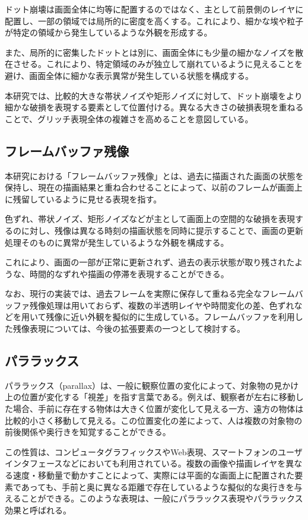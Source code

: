 ドット崩壊は画面全体に均等に配置するのではなく、主として前景側のレイヤに配置し、一部の領域では局所的に密度を高くする。これにより、細かな埃や粒子が特定の領域から発生しているような外観を形成する。

また、局所的に密集したドットとは別に、画面全体にも少量の細かなノイズを散在させる。これにより、特定領域のみが独立して崩れているように見えることを避け、画面全体に細かな表示異常が発生している状態を構成する。

本研究では、比較的大きな帯状ノイズや矩形ノイズに対して、ドット崩壊をより細かな破損を表現する要素として位置付ける。異なる大きさの破損表現を重ねることで、グリッチ表現全体の複雑さを高めることを意図している。


\subsection{フレームバッファ残像}

本研究における「フレームバッファ残像」とは、過去に描画された画面の状態を保持し、現在の描画結果と重ね合わせることによって、以前のフレームが画面上に残留しているように見せる表現を指す。

色ずれ、帯状ノイズ、矩形ノイズなどが主として画面上の空間的な破損を表現するのに対し、残像は異なる時刻の描画状態を同時に提示することで、画面の更新処理そのものに異常が発生しているような外観を構成する。

これにより、画面の一部が正常に更新されず、過去の表示状態が取り残されたような、時間的なずれや描画の停滞を表現することができる。

なお、現行の実装では、過去フレームを実際に保存して重ねる完全なフレームバッファ残像処理は用いておらず、複数の半透明レイヤや時間変化の差、色ずれなどを用いて残像に近い外観を擬似的に生成している。フレームバッファを利用した残像表現については、今後の拡張要素の一つとして検討する。


\subsection{パララックス}

パララックス（parallax）は、一般に観察位置の変化によって、対象物の見かけ上の位置が変化する「視差」を指す言葉である。例えば、観察者が左右に移動した場合、手前に存在する物体は大きく位置が変化して見える一方、遠方の物体は比較的小さく移動して見える。この位置変化の差によって、人は複数の対象物の前後関係や奥行きを知覚することができる。

この性質は、コンピュータグラフィックスやWeb表現、スマートフォンのユーザインタフェースなどにおいても利用されている。複数の画像や描画レイヤを異なる速度・移動量で動かすことによって、実際には平面的な画面上に配置された要素であっても、手前と奥に異なる距離で存在しているような擬似的な奥行きを与えることができる。このような表現は、一般にパララックス表現やパララックス効果と呼ばれる。

